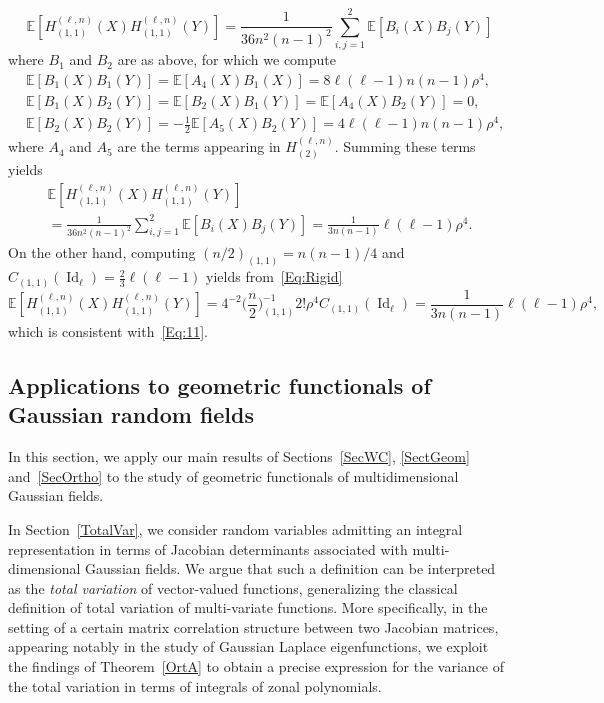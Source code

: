 \documentclass[AHL,Unicode,longabstracts,published]{cedram}
\DeclareMathOperator{\Id}{Id}
\newcommand{\E}[1]{\mathbb{E}\left[#1\right]}
\begin{document}
\begin{exam}
\[
\E{H_{(1,1)}^{(\ell,n)}(X)H_{(1,1)}^{(\ell,n)}(Y)} = \frac{1}{36n^2(n-1)^2}\sum_{i,j=1}^2\E{B_i(X)B_j(Y)}
\]
where $B_1$ and $B_2$ are as above, for which we compute
\begin{align*}
&\E{B_1(X)B_1(Y)} = \E{A_4(X)B_1(X)} = 8\ell (\ell-1)n(n-1)\rho^4, \\
&\E{B_1(X)B_2(Y)} = \E{B_2(X)B_1(Y)} = \E{A_4(X)B_2(Y)} = 0,\\
&\E{B_2(X)B_2(Y)} = -\frac{1}{2}\E{A_5(X)B_2(Y)} =4 \ell (\ell-1)n(n-1)\rho^4,
\end{align*}
where $A_4$ and $A_5$ are the terms appearing in $H_{(2)}^{(\ell,n)}$. Summing these terms yields
\begin{multline}\label{Eq:11}
\E{H_{(1,1)}^{(\ell,n)}(X)H_{(1,1)}^{(\ell,n)}(Y)}\\
= \frac{1}{36n^2(n-1)^2}\sum_{i,j=1}^2\E{B_i(X)B_j(Y)} = \frac{1}{3n(n-1)}\ell(\ell-1)\rho^4.
\end{multline}
On the other hand, computing $(n/2)_{(1,1)} = n(n-1)/4$ and $ C_{(1,1)}(\Id_{\ell}) = \frac{2}{3}\ell(\ell-1)$ yields from~\eqref{Eq:Rigid}
\[
\E{H_{(1,1)}^{(\ell,n)}(X)H_{(1,1)}^{(\ell,n)}(Y)} =4^{-2}\bigg(\frac{n}{2}\bigg)_{(1,1)}^{-1} 2 ! \rho^{4}C_{(1,1)}(\Id_{\ell}) =
\frac{1}{3n(n-1)}\ell(\ell-1)\rho^4,
\]
which is consistent with~\eqref{Eq:11}.
\end{exam}



\subsection{Applications to geometric functionals of Gaussian random fields}\label{SecApp}

In this section, we apply our main results of Sections~\ref{SecWC}, \ref{SectGeom} and~\ref{SecOrtho} to the study of geometric functionals of multidimensional Gaussian fields.

In Section~\ref{TotalVar}, we consider random variables admitting an integral representation in terms of Jacobian determinants associated with multi-dimensional Gaussian fields. We argue that such a definition can be interpreted as the \emph{total variation} of vector-valued functions, generalizing the classical definition of total variation of multi-variate functions. More specifically, in the setting of a certain matrix correlation structure between two Jacobian matrices, appearing notably in the study of Gaussian Laplace eigenfunctions, we exploit the findings of Theorem~\ref{OrtA} to obtain a precise expression for the variance of the total variation in terms of integrals of zonal polynomials.
\end{document}
